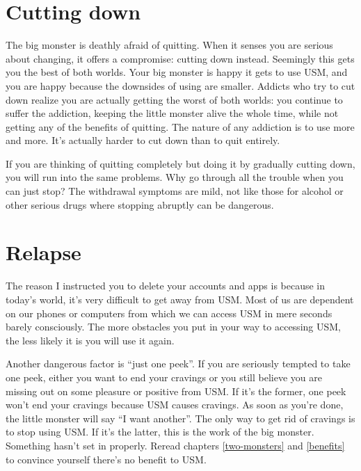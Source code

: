 \documentclass[
]{book}
\begin{document}
\section{Cutting down}\label{cutting-down}

The big monster is deathly afraid of quitting. When it senses you are serious about changing, it offers a compromise: cutting down instead. Seemingly this gets you the best of both worlds. Your big monster is happy it gets to use USM, and you are happy because the downsides of using are smaller. Addicts who try to cut down realize you are actually getting the worst of both worlds: you continue to suffer the addiction, keeping the little monster alive the whole time, while not getting any of the benefits of quitting. The nature of any addiction is to use more and more. It's actually harder to cut down than to quit entirely.

If you are thinking of quitting completely but doing it by gradually cutting down, you will run into the same problems. Why go through all the trouble when you can just stop? The withdrawal symptoms are mild, not like those for alcohol or other serious drugs where stopping abruptly can be dangerous.

\section{Relapse}\label{relapse}

The reason I instructed you to delete your accounts and apps is because in today's world, it's very difficult to get away from USM. Most of us are dependent on our phones or computers from which we can access USM in mere seconds barely consciously. The more obstacles you put in your way to accessing USM, the less likely it is you will use it again.

Another dangerous factor is ``just one peek''. If you are seriously tempted to take one peek, either you want to end your cravings or you still believe you are missing out on some pleasure or positive from USM. If it's the former, one peek won't end your cravings because USM causes cravings. As soon as you're done, the little monster will say ``I want another''. The only way to get rid of cravings is to stop using USM. If it's the latter, this is the work of the big monster. Something hasn't set in properly. Reread chapters \ref{two-monsters} and \ref{benefits} to convince yourself there's no benefit to USM.
\end{document}
